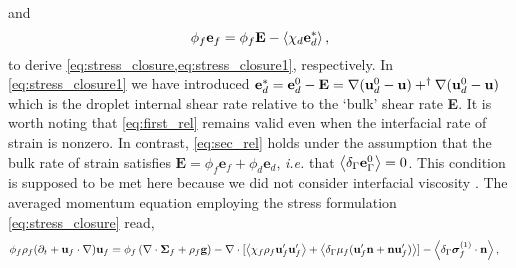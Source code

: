 and
\begin{equation}
\phi _f\textbf{e}_f
    = 
    \phi_f \textbf{E}
    - \avg{\chi_d \textbf{e}_d^*},
    \label{eq:sec_rel}
\end{equation}
to derive \ref{eq:stress_closure,eq:stress_closure1}, respectively. 
In \ref{eq:stress_closure1} we have introduced $\textbf{e}_d^* = \textbf{e}_d^0 - \textbf{E} = \mathbf{\nabla} (\textbf{u}_d^0-\textbf{u})+^\dagger\mathbf{\nabla} (\textbf{u}_d^0-\textbf{u})$ which is the droplet internal shear rate relative to the `bulk' shear rate \textbf{E}.
It is worth noting that \ref{eq:first_rel} remains valid even when the interfacial rate of strain is nonzero. 
In contrast, \ref{eq:sec_rel} holds under the assumption that the bulk rate of strain satisfies $\textbf{E} = \phi_f \textbf{e}_f + \phi_d \textbf{e}_d$, \textit{i.e.} that $\left<\delta_\Gamma \textbf{e}_\Gamma^0\right> = 0$. 
This condition is supposed to be met here because we did not consider interfacial viscosity \citep{nadim1996concise}.
The averaged momentum equation  employing the stress formulation \ref{eq:stress_closure} read, 
\begin{align}
    \phi_f \rho_f(\pddt + \textbf{u}_f  \cdot \grad) \textbf{u}_f
    &= \phi_f 
    \left(\div \bm{\Sigma}_f
    + \rho_f \textbf{g}\right)
    - \div 
    [\avg{\chi_f\rho_f \textbf{u}_f'\textbf{u}_f'}
    +\avg{\delta_\Gamma \mu_f( \textbf{u}_f'  \textbf{n} +  \textbf{n} \textbf{u}_f')}]
    - \avg{\delta_\Gamma \bm\sigma_f^{(1)}\cdot \textbf{n}},
    \label{eq:two_fluid_momentum}
\end{align}
